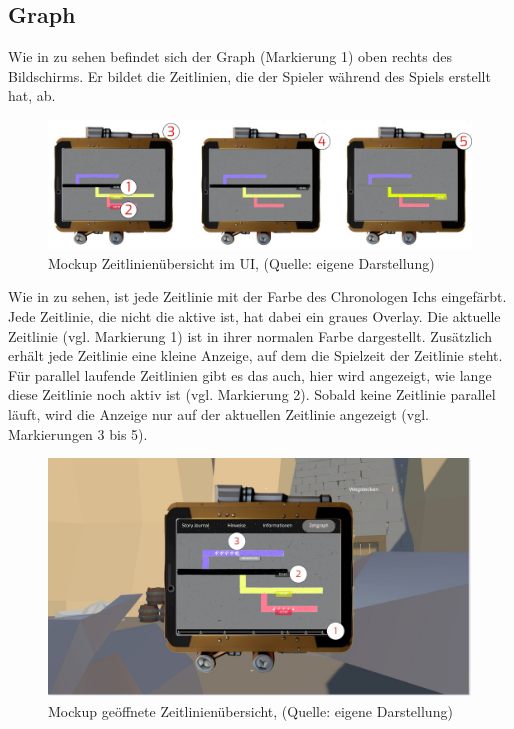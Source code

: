 \subsection{Graph}\label{sec:graph_ui}
Wie in  zu sehen befindet sich der Graph (Markierung 1) oben rechts des Bildschirms. Er bildet die Zeitlinien, die der Spieler während des Spiels erstellt hat, ab. 

\begin{figure}[ht]
\centering
\includegraphics[width=1\linewidth]{content/pictures/Graph.jpg}
\caption{Mockup Zeitlinienübersicht im UI, (Quelle: eigene Darstellung)}
\label{fig:ui_graph-player}
\end{figure}

Wie in  zu sehen, ist jede Zeitlinie mit der Farbe des Chronologen Ichs eingefärbt. Jede Zeitlinie, die nicht die aktive ist, hat dabei ein graues Overlay. Die aktuelle Zeitlinie (vgl. Markierung 1) ist in ihrer normalen Farbe dargestellt. Zusätzlich erhält jede Zeitlinie eine kleine Anzeige, auf dem die Spielzeit der Zeitlinie steht. Für parallel laufende Zeitlinien gibt es das auch, hier wird angezeigt, wie lange diese Zeitlinie noch aktiv ist (vgl. Markierung 2). Sobald keine Zeitlinie parallel läuft, wird die Anzeige nur auf der aktuellen Zeitlinie angezeigt (vgl. Markierungen 3 bis 5).

\begin{figure}[ht]
\centering
\includegraphics[width=1\linewidth]{content/pictures/Graph-UI.jpg}
\caption{Mockup geöffnete Zeitlinienübersicht, (Quelle: eigene Darstellung)}
\label{fig:ui_graph_full}
\end{figure}

